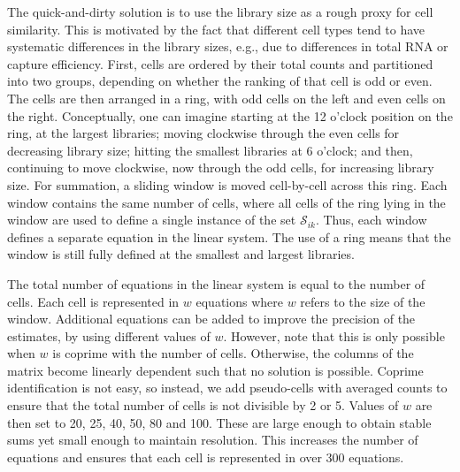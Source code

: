 \documentclass{article}
\begin{document}
The quick-and-dirty solution is to use the library size as a rough proxy for cell similarity.
This is motivated by the fact that different cell types tend to have systematic differences in the library sizes, e.g., due to differences in total RNA or capture efficiency.
First, cells are ordered by their total counts and partitioned into two groups, depending on whether the ranking of that cell is odd or even.
The cells are then arranged in a ring, with odd cells on the left and even cells on the right.
Conceptually, one can imagine starting at the 12 o'clock position on the ring, at the largest libraries; moving clockwise through the even cells for decreasing library size;
    hitting the smallest libraries at 6 o'clock; and then, continuing to move clockwise, now through the odd cells, for increasing library size.
For summation, a sliding window is moved cell-by-cell across this ring.
Each window contains the same number of cells, where all cells of the ring lying in the window are used to define a single instance of the set $\mathcal{S}_{ik}$.
Thus, each window defines a separate equation in the linear system.
The use of a ring means that the window is still fully defined at the smallest and largest libraries.

The total number of equations in the linear system is equal to the number of cells.
Each cell is represented in $w$ equations where $w$ refers to the size of the window.
Additional equations can be added to improve the precision of the estimates, by using different values of $w$.
However, note that this is only possible when $w$ is coprime with the number of cells.
Otherwise, the columns of the matrix become linearly dependent such that no solution is possible.
Coprime identification is not easy, so instead, we add pseudo-cells with averaged counts to ensure that the total number of cells is not divisible by 2 or 5.
Values of $w$ are then set to 20, 25, 40, 50, 80 and 100.
These are large enough to obtain stable sums yet small enough to maintain resolution.
This increases the number of equations and ensures that each cell is represented in over 300 equations.
\end{document}
